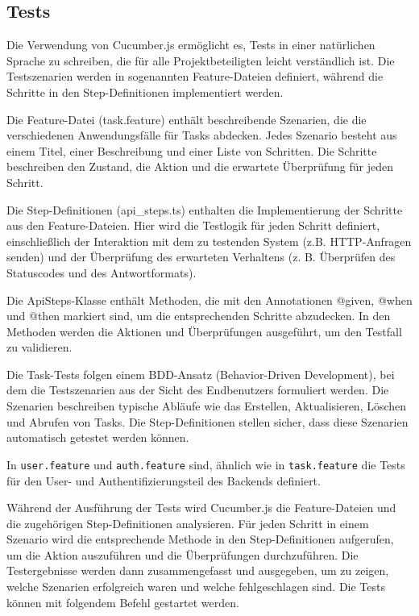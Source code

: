\documentclass[a4paper, 12pt]{article}
\begin{document}
    \subsection{Tests}

    Die Verwendung von Cucumber.js ermöglicht es, Tests in einer natürlichen Sprache zu schreiben, die für alle Projektbeteiligten leicht
    verständlich ist. Die Testszenarien werden in sogenannten Feature-Dateien definiert, während die Schritte in den Step-Definitionen
    implementiert werden.

    Die Feature-Datei (task.feature) enthält beschreibende Szenarien, die die verschiedenen Anwendungsfälle für Tasks abdecken. Jedes Szenario
    besteht aus einem Titel, einer Beschreibung und einer Liste von Schritten. Die Schritte beschreiben
    den Zustand, die Aktion und die erwartete Überprüfung für jeden Schritt.

    Die Step-Definitionen (api\_steps.ts) enthalten die Implementierung der Schritte aus den Feature-Dateien. Hier wird die Testlogik für jeden
    Schritt definiert, einschließlich der Interaktion mit dem zu testenden System (z.B. HTTP-Anfragen senden) und der Überprüfung des erwarteten
    Verhaltens (z. B. Überprüfen des Statuscodes und des Antwortformats).

    Die ApiSteps-Klasse enthält Methoden, die mit den Annotationen @given, @when und @then markiert sind, um die entsprechenden Schritte
    abzudecken. In den Methoden werden die Aktionen und Überprüfungen ausgeführt, um den Testfall zu validieren.

    Die Task-Tests folgen einem BDD-Ansatz (Behavior-Driven Development), bei dem die Testszenarien aus der Sicht des Endbenutzers formuliert
    werden. Die Szenarien beschreiben typische Abläufe wie das Erstellen, Aktualisieren, Löschen und Abrufen von Tasks. Die Step-Definitionen
    stellen sicher, dass diese Szenarien automatisch getestet werden können.

    In {\tt user.feature} und {\tt auth.feature} sind, ähnlich wie in {\tt task.feature} die Tests für den User- und Authentifizierungsteil des Backends definiert.

    Während der Ausführung der Tests wird Cucumber.js die Feature-Dateien und die zugehörigen Step-Definitionen analysieren. Für jeden Schritt
    in einem Szenario wird die entsprechende Methode in den Step-Definitionen aufgerufen, um die Aktion auszuführen und die Überprüfungen
    durchzuführen. Die Testergebnisse werden dann zusammengefasst und ausgegeben, um zu zeigen, welche Szenarien erfolgreich waren und welche
    fehlgeschlagen sind. Die Tests können mit folgendem Befehl gestartet werden.
\end{document}
